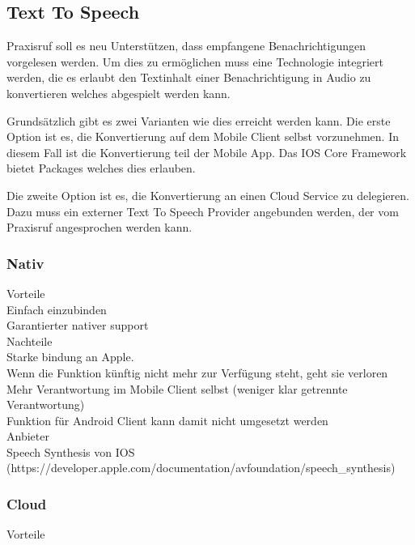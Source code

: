\subsection{Text To Speech}

Praxisruf soll es neu Unterstützen, dass empfangene Benachrichtigungen vorgelesen werden.
Um dies zu ermöglichen muss eine Technologie integriert werden, die es erlaubt den Textinhalt einer Benachrichtigung
in Audio zu konvertieren welches abgespielt werden kann.

Grundsätzlich gibt es zwei Varianten wie dies erreicht werden kann.
Die erste Option ist es, die Konvertierung auf dem Mobile Client selbst vorzunehmen.
In diesem Fall ist die Konvertierung teil der Mobile App.
Das IOS Core Framework bietet Packages welches dies erlauben.

Die zweite Option ist es, die Konvertierung an einen Cloud Service zu delegieren.
Dazu muss ein externer Text To Speech Provider angebunden werden, der vom Praxisruf angesprochen werden kann.


\subsubsection{Nativ}

Vorteile \\

Einfach einzubinden \\
Garantierter nativer support \\

Nachteile \\

Starke bindung an Apple. \\
Wenn die Funktion künftig nicht mehr zur Verfügung steht, geht sie verloren \\
Mehr Verantwortung im Mobile Client selbst (weniger klar getrennte Verantwortung) \\
Funktion für Android Client kann damit nicht umgesetzt werden \\


Anbieter \\
Speech Synthesis von IOS (https://developer.apple.com/documentation/avfoundation/speech_synthesis)

\subsubsection{Cloud}

Vorteile \\

